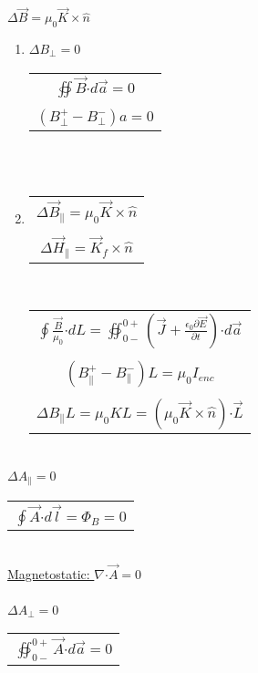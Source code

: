 \documentclass[12pt]{article}
\newcommand{\dotP}{\boldsymbol \cdot}		%
\begin{document}
\begin{minipage}[t]{.55\textwidth}
	\hfill \break
	\( \boxed{ \Delta \vec{B} = \mu_0 \vec{K} \times  \hat{n} } \) \\
	\begin{enumerate}
		\item {
			\( \boxed{ \displaystyle \Delta B_{\perp} = 0 } \) \ \ \ 
			\begin{tabular}{|c}
				\( \displaystyle \oiint \vec{B} \dotP d\vec{a} = 0 \) \\ \\
				\( \displaystyle (B_{\perp}^{+} - B_{\perp}^{-}) a = 0 \) 
			\end{tabular}
		} \\ \\
		\item {
			\begin{tabular}{c}
				\( \boxed{ \displaystyle \Delta \vec{B}_{\parallel} = \mu_0 \vec{K} \times \hat{n}  } \) \\ \\
				\( \boxed{ \displaystyle \Delta \vec{H}_{\parallel} = \vec{K}_f \times \hat{n}  } \)
			\end{tabular}
			\ \ \ 
			\begin{tabular}{|c}
				\( \displaystyle \oint \frac{\vec{B}}{\mu_0} \dotP dL = \oiint_{0-}^{0+} 
					\left ( \vec{J} + \frac{\epsilon_0 \partial \vec{E}}{\partial t} \right ) 
					\dotP d\vec{a} \)\\ \\
				\( \displaystyle (B_{\parallel}^{+} - B_{\parallel}^{-}) L = \mu_0 I_{enc} \) \\ \\
				\( \displaystyle \Delta B_{\parallel}L = \mu_0 K L = (\mu_0 \vec{K} \times \hat{n}) \dotP \vec{L} \)
			\end{tabular}
		}
	\end{enumerate}

	\hfill \break \\
	\( \boxed{ \Delta A_{\parallel} = 0 } \) \ \ \
	\begin{tabular}{|c}
		\( \displaystyle \oint \vec{A} \dotP d\vec{l} = \Phi_B = 0 \)
	\end{tabular}

	\hfill \break \\
	\underline{Magnetostatic: \( \nabla \dotP \vec{A} = 0 \) } \\ \\
	\( \boxed{ \Delta A_{\perp} = 0 } \) \ \ \
	\begin{tabular}{|c}
		\( \displaystyle \oiint_{0-}^{0+} \vec{A} \dotP d\vec{a} = 0 \)
	\end{tabular}	


\end{minipage}
\end{document}

